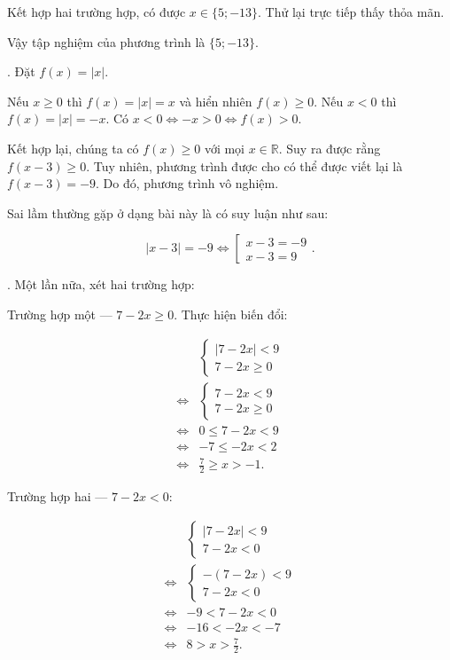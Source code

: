 Kết hợp hai trường hợp, có được $x \in \{5; -13\}$. Thử lại trực tiếp thấy thỏa mãn.

Vậy tập nghiệm của phương trình là $\{5; -13\}$.

. Đặt $f(x) = |x|$.

Nếu \textcolor{colorEmphasisCyan}{$x \geq 0$} thì $f(x) = |x| = x$ và hiển nhiên $f(x) \geq 0$. Nếu \textcolor{colorEmphasis}{$x < 0$} thì $f(x) = |x| = -x$. Có $x < 0 \iff -x > 0 \iff f(x) > 0$.

Kết hợp lại, chúng ta có $f(x) \geq 0$ với mọi $x \in \mathbb{R}$. Suy ra được rằng $f(x - 3) \geq 0$. Tuy nhiên, phương trình được cho có thể được viết lại là $f(x - 3) = -9$. Do đó, phương trình vô nghiệm.

Sai lầm thường gặp ở dạng bài này là có suy luận như sau:

\begin{equation*}
   |x - 3| = -9 \iff \left[\begin{array}{l}
      x - 3 = -9 \\
      x - 3 = 9
   \end{array}\right..
\end{equation*}

. Một lần nữa, xét hai trường hợp:

\textcolor{colorEmphasisCyan}{Trường hợp một --- $7 - 2x \geq 0$}. Thực hiện biến đổi:

\begin{align*}
   &\begin{cases}
      |7 - 2x| < 9 \\
      7 - 2x \geq 0
   \end{cases} \\
   \iff &\begin{cases}
      7 - 2x < 9 \\
      7 - 2x \geq 0
   \end{cases} \\
   \iff &0 \leq 7 - 2x < 9 \\
   \iff &-7 \leq -2x < 2 \\
   \iff &\frac{7}{2} \geq x > -1.
\end{align*}

\textcolor{colorEmphasis}{Trường hợp hai --- $7 - 2x < 0$}:

\begin{align*}
   &\begin{cases}
      |7 - 2x| < 9 \\
      7 - 2x < 0
   \end{cases} \\
   \iff &\begin{cases}
      - (7 - 2x) < 9 \\
      7 - 2x < 0
   \end{cases} \\
   \iff & -9 < 7 - 2x < 0 \\
   \iff & -16 < -2x < -7 \\
   \iff & 8 > x > \frac{7}{2}.
\end{align*}

